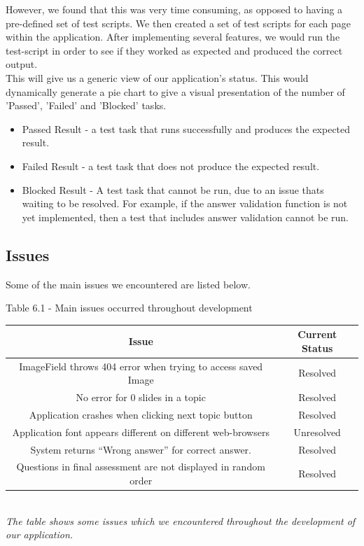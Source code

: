 \documentclass{l3proj}
\begin{document}
{However, we found that this was very time consuming, as opposed to having a pre-defined set of test scripts. We then created a set of test scripts for each page within the application. After implementing several features, we would run the test-script in order to see if they worked as expected and produced the correct output.\\
This will give us a generic view of our application's status. This would dynamically generate a pie chart to give a visual presentation of the number of 'Passed', 'Failed' and 'Blocked' tasks.

\begin{itemize}
\item Passed Result - a test task that runs successfully and produces the expected result.
\item Failed Result - a test task that does not produce the expected result.
\item Blocked Result - A test task that cannot be run, due to an issue thats waiting to be resolved. For example, if the answer validation function is not yet implemented, then a test that includes answer validation cannot be run.
\end{itemize}

\subsection{Issues}

Some of the main issues we encountered are listed below.

\begin{center}
Table 6.1 - Main issues occurred throughout development\\
\begin{tabular}{|c|c|}
\hline \textbf{Issue} & \textbf{Current Status}\\
\hline 
\hline ImageField throws 404 error when trying to access saved Image & Resolved\\
\hline No error for 0 slides in a topic & Resolved\\
\hline Application crashes when clicking next topic button & Resolved\\
\hline Application font appears different on different web-browsers & Unresolved\\
\hline System returns ``Wrong answer'' for correct answer. & Resolved\\
\hline Questions in final assessment are not displayed in random order & Resolved\\
\hline
\end{tabular}\\
\textit{{\small The table shows some issues which we encountered throughout the development of our application.}}
\end{center}


}
\end{document}
